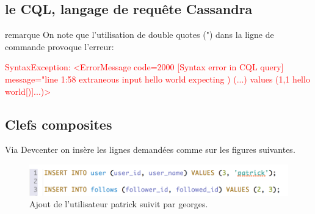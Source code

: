 \subsection{le CQL, langage de requête Cassandra}


\par 
\begin{block}{remarque}
On note que l\rq utilisation de double quotes (") dans la ligne de commande provoque l'erreur: \newline
\begin{tt}
\textcolor{red}{
SyntaxException: <ErrorMessage code=2000 [Syntax error in CQL query]
message="line 1:58 extraneous input hello world expecting ) (...) values (1,1 hello world[)]...)>
}
\end{tt}
\end{block}

\subsection{Clefs composites}
Via Devcenter on insère les lignes demandées comme sur les figures suivantes. \newline
\begin{figure}[h!]
\centering
\includegraphics[scale=0.7]{img/add_patrick.png}
\caption{Ajout de l'utilisateur patrick suivit par georges.}
\end{figure}

